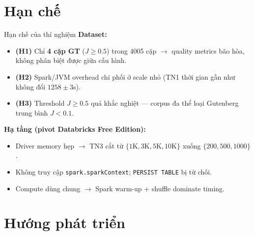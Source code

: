 \documentclass[10pt,aspectratio=169]{beamer}
\begin{document}
\section{Hạn chế}

\begin{frame}{Hạn chế của thí nghiệm}
  \textbf{Dataset:}
  \begin{itemize}
    \item \textbf{(H1)} Chỉ \textbf{4 cặp GT} ($J \geq 0.5$) trong 4005 cặp $\rightarrow$ quality metrics bão hòa, không phân biệt được giữa cấu hình.
    \item \textbf{(H2)} Spark/JVM overhead chi phối ở scale nhỏ (TN1 thời gian gần như không đổi $1258 \pm 3$s).
    \item \textbf{(H3)} Threshold $J \geq 0.5$ quá khắc nghiệt --- corpus đa thể loại Gutenberg trung bình $J < 0.1$.
  \end{itemize}

  \vfill
  \textbf{Hạ tầng (pivot Databricks Free Edition):}
  \begin{itemize}
    \item Driver memory hẹp $\rightarrow$ TN3 cắt từ $\{1\text{K},3\text{K},5\text{K},10\text{K}\}$ xuống $\{200, 500, 1000\}$.
    \item Không truy cập \texttt{spark.sparkContext}; \texttt{PERSIST TABLE} bị từ chối.
    \item Compute dùng chung $\rightarrow$ Spark warm-up + shuffle dominate timing.
  \end{itemize}
\end{frame}

\section{Hướng phát triển}
\end{document}
